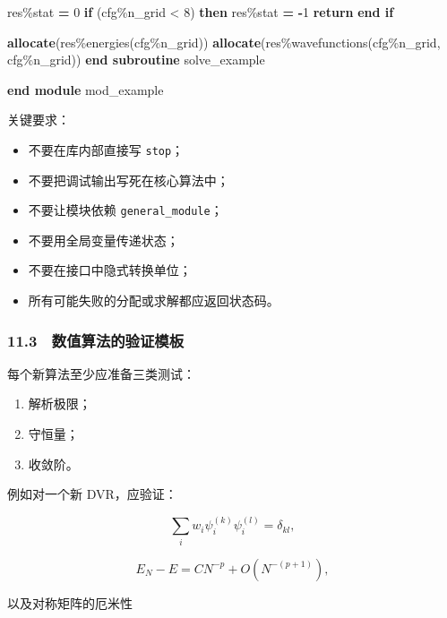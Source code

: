 \documentclass[
]{ctexbook}
\newenvironment{Shaded}{}{}
\newcommand{\DecValTok}[1]{\textcolor[rgb]{0.25,0.63,0.44}{#1}}
\newcommand{\KeywordTok}[1]{\textcolor[rgb]{0.00,0.44,0.13}{\textbf{#1}}}
\newcommand{\NormalTok}[1]{#1}
\newcommand{\OperatorTok}[1]{\textcolor[rgb]{0.40,0.40,0.40}{#1}}
\providecommand{\tightlist}{%
  \setlength{\itemsep}{0pt}\setlength{\parskip}{0pt}}
\begin{document}
\begin{Shaded}
\begin{Highlighting}[]
\NormalTok{        res\%stat }\KeywordTok{=} \DecValTok{0}
        \KeywordTok{if}\NormalTok{ (cfg\%n\_grid }\OperatorTok{\textless{}} \DecValTok{8}\NormalTok{) }\KeywordTok{then}
\NormalTok{            res\%stat }\KeywordTok{=} \KeywordTok{{-}}\DecValTok{1}
            \KeywordTok{return}
        \KeywordTok{end if}

        \KeywordTok{allocate}\NormalTok{(res\%energies(cfg\%n\_grid))}
        \KeywordTok{allocate}\NormalTok{(res\%wavefunctions(cfg\%n\_grid, cfg\%n\_grid))}
    \KeywordTok{end subroutine}\NormalTok{ solve\_example}

\KeywordTok{end module}\NormalTok{ mod\_example}
\end{Highlighting}
\end{Shaded}

关键要求：

\begin{itemize}
\tightlist
\item
  不要在库内部直接写 \texttt{stop}；
\item
  不要把调试输出写死在核心算法中；
\item
  不要让模块依赖 \texttt{general\_module}；
\item
  不要用全局变量传递状态；
\item
  不要在接口中隐式转换单位；
\item
  所有可能失败的分配或求解都应返回状态码。
\end{itemize}

\hypertarget{ux6570ux503cux7b97ux6cd5ux7684ux9a8cux8bc1ux6a21ux677f}{%
\subsubsection{11.3　数值算法的验证模板}\label{ux6570ux503cux7b97ux6cd5ux7684ux9a8cux8bc1ux6a21ux677f}}

每个新算法至少应准备三类测试：

\begin{enumerate}
\def\labelenumi{\arabic{enumi}.}
\tightlist
\item
  解析极限；
\item
  守恒量；
\item
  收敛阶。
\end{enumerate}

例如对一个新 DVR，应验证：

\[
\sum_i w_i\psi_i^{(k)}\psi_i^{(l)}=\delta_{kl},
\]

\[
E_N-E
=
CN^{-p}+O(N^{-(p+1)}),
\]

以及对称矩阵的厄米性
\end{document}
